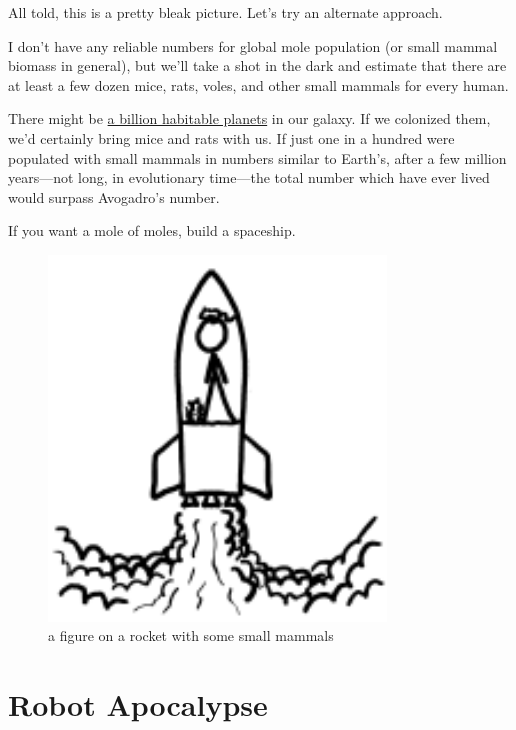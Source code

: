 {All told, this is a pretty bleak picture. Let’s try an alternate approach.}

{I don’t have any reliable numbers for global mole population (or small mammal biomass in general), but we’ll take a shot in the dark and estimate that there are at least a few dozen mice, rats, voles, and other small mammals for every human.}

{There might be \href{http://blogs.discovermagazine.com/badastronomy/2010/10/29/how-many-habitable-planets-are-there-in-the-galaxy/}{a billion habitable planets} in our galaxy. If we colonized them, we’d certainly bring mice and rats with us. If just one in a hundred were populated with small mammals in numbers similar to Earth’s, after a few million years—not long, in evolutionary time—the total number which have ever lived would surpass Avogadro’s number.}

{If you want a mole of moles, build a spaceship.}

\begin{figure}[!htbp]
\centering
\includegraphics[scale=0.5, max width=0.8\textwidth]{imgs/a/4/moles_rocket.png}
\caption{a figure on a rocket with some small mammals}
\end{figure}

{
\chapter{Robot Apocalypse}
}

